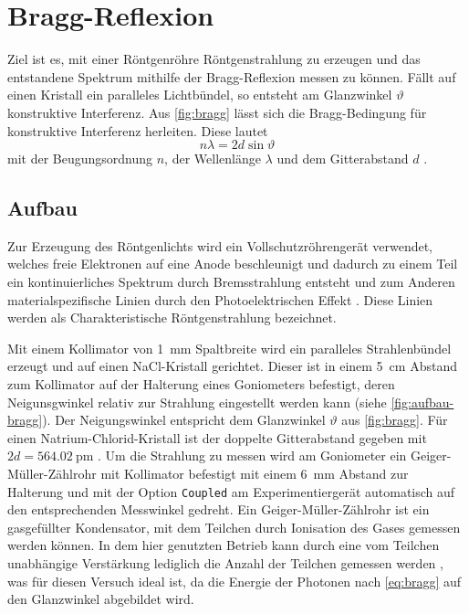 \section{Bragg-Reflexion}\label{sec:bragg}
Ziel ist es, mit einer Röntgenröhre Röntgenstrahlung zu erzeugen und das entstandene
Spektrum mithilfe der Bragg-Reflexion messen zu können. Fällt auf einen Kristall ein
paralleles Lichtbündel, so entsteht am Glanzwinkel $\vartheta$ konstruktive Interferenz.
Aus \cref{fig:bragg} lässt sich die Bragg-Bedingung für konstruktive Interferenz
herleiten. Diese lautet
\begin{equation}
	n\lambda = 2d\sin\vartheta
	\label{eq:bragg}
\end{equation}
mit der Beugungsordnung $n$, der Wellenlänge $\lambda$ und dem Gitterabstand $d$ \cite{wiki:bragg}.

\subsection{Aufbau}
Zur Erzeugung des Röntgenlichts wird ein Vollschutzröhrengerät verwendet, welches
freie Elektronen auf eine Anode beschleunigt und dadurch zu einem Teil ein kontinuierliches
Spektrum durch Bremsstrahlung entsteht und zum Anderen materialspezifische Linien
durch den Photoelektrischen Effekt \cite{wiki:roentgenroehre}. Diese Linien werden
als Charakteristische Röntgenstrahlung bezeichnet.\par
Mit einem Kollimator von \SI{1}{\mm} Spaltbreite wird ein paralleles Strahlenbündel erzeugt
und auf einen NaCl-Kristall gerichtet. Dieser ist in einem \SI{5}{\cm} Abstand zum
Kollimator auf der Halterung eines Goniometers befestigt, deren Neigunsgwinkel relativ zur Strahlung
eingestellt werden kann (siehe \cref{fig:aufbau-bragg}). Der Neigungswinkel entspricht dem Glanzwinkel $\vartheta$ aus
\cref{fig:bragg}.
Für einen Natrium-Chlorid-Kristall ist der doppelte Gitterabstand gegeben mit $2d = \SI{564.02}{\pm}$ \cite{ld_bragg}.
Um die Strahlung zu messen wird am Goniometer ein Geiger-Müller-Zählrohr mit Kollimator befestigt mit einem
\SI{6}{\mm} Abstand zur Halterung und mit der Option
\verb|Coupled| am Experimentiergerät automatisch auf den entsprechenden Messwinkel gedreht.
Ein Geiger-Müller-Zählrohr ist ein gasgefüllter Kondensator, mit dem Teilchen durch Ionisation des Gases gemessen
werden können. In dem hier genutzten Betrieb kann durch eine vom Teilchen unabhängige Verstärkung lediglich
die Anzahl der Teilchen gemessen werden \cite{wermes}, was für diesen Versuch ideal ist, da die Energie
der Photonen nach \cref{eq:bragg} auf den Glanzwinkel abgebildet wird.\par

